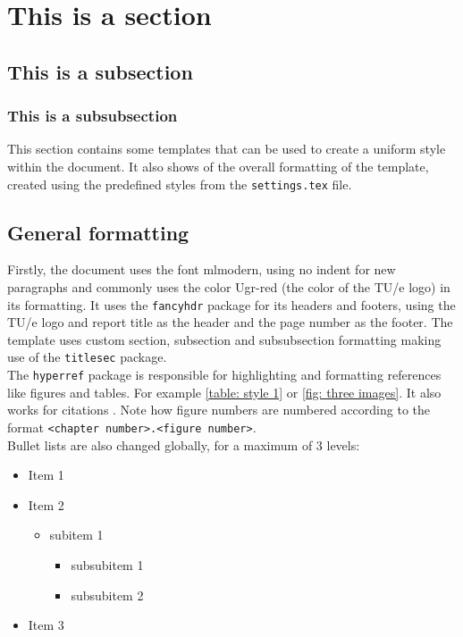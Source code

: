 \section{This is a section} 
\subsection{This is a subsection}

\subsubsection{This is a subsubsection}
This section contains some templates that can be used to create a uniform style within the document. It also shows of the overall formatting of the template, created using the predefined styles from the \texttt{settings.tex} file.

\subsection{General formatting}
Firstly, the document uses the font mlmodern, using no indent for new paragraphs and commonly uses the color \textcolor{Ugr-red}{Ugr-red} (the color of the TU/e logo) in its formatting. It uses the \texttt{fancyhdr} package for its headers and footers, using the TU/e logo and report title as the header and the page number as the footer. The template uses custom section, subsection and subsubsection formatting making use of the \texttt{titlesec} package.\\
The \texttt{hyperref} package is responsible for highlighting and formatting references like figures and tables. For example \cref{table: style 1} or \cref{fig: three images}. It also works for citations \cite{texbook}. Note how figure numbers are numbered according to the format \texttt{<chapter number>.<figure number>}.\\

Bullet lists are also changed globally, for a maximum of 3 levels:

\begin{itemize}
	\item Item 1
	\item Item 2
	      \begin{itemize}
		      \item subitem 1
		            \begin{itemize}
			            \item subsubitem 1
			            \item subsubitem 2
		            \end{itemize}
	      \end{itemize}
	\item Item 3
\end{itemize}

